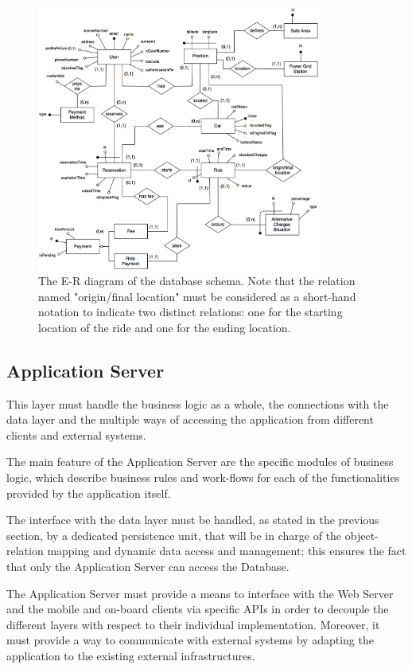 \begin{figure}[H]
\begin{center}
		\includegraphics[width=0.85\textwidth]{./arch_design/diagrams/er_dg.png}
		\caption{The E-R diagram of the database schema. Note that the relation named "origin/final location" must be considered as a short-hand notation to indicate two distinct relations: one for the starting location of the ride and one for the ending location.}
		\label{er_dg}
\end{center}
\end{figure}

\subsection{Application Server}
This layer must handle the business logic as a whole, the connections with the data layer and the multiple ways of accessing the application from different clients and external systems.

The main feature of the Application Server are the specific modules of business logic, which describe business rules and work-flows for each of the functionalities provided by the application itself.

The interface with the data layer must be handled, as stated in the previous section, by a dedicated persistence unit, that will be in charge of the object-relation mapping and dynamic data access and management; this ensures the fact that only the Application Server can access the Database.

The Application Server must provide a means to interface with the Web Server and the mobile and on-board clients via specific APIs in order to decouple the different layers with respect to their individual implementation. Moreover, it must provide a way to communicate with external systems by adapting the application to the existing external infrastructures.

